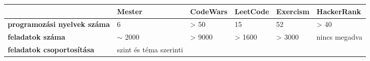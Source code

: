 {
    \footnotesize
    \begin{tabularx}{\textwidth}{@{}X|X|X|X|X|X@{}}
                                                                                                                    &
        \textbf{Mester}                                                                                             &
        \textbf{CodeWars}                                                                                           &
        \textbf{LeetCode}                                                                                           &
        \textbf{Exercism}                                                                                           &
        \textbf{HackerRank}{}                                                                                         \\ \hline \endhead
        \textbf{programozási nyelvek száma}                                                                         &
        6                                                                                                           &
        \textgreater{} 50                                                                                           &
        15                                                                                                          &
        52                                                                                                          &
        \textgreater{} 40                                                                                             \\ \hline
        \textbf{feladatok száma}                                                                                    &
        $\sim$ 2000                                                                                                 &
        \textgreater{} 9000                                                                                         &
        \textgreater{} 1600                                                                                         &
        \textgreater{} 3000                                                                                         &
        nincs megadva                                                                                                 \\ \hline
        \textbf{feladatok csoportosítása}                                                                           &
        szint és téma szerinti                                                                                      &

\end{tabularx}}
